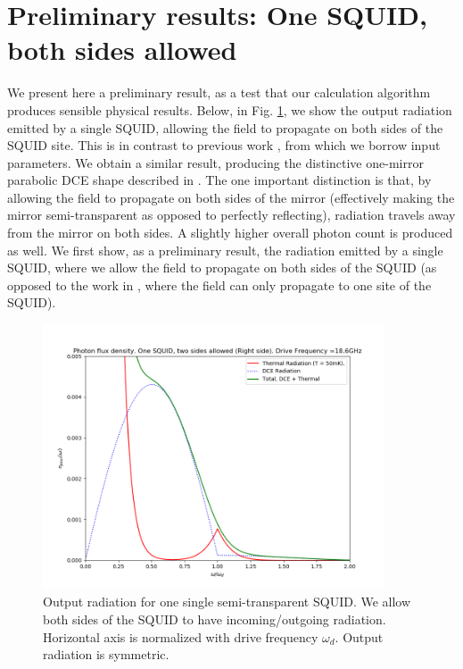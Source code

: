 \section{Preliminary results: One SQUID, both sides allowed}\label{sec:results_both_sides}
%
We present here a preliminary result, as a test that our calculation algorithm produces sensible physical results. Below, in Fig. \ref{fig:naked_SQUID}, we show the output radiation emitted by a single SQUID, allowing the field to propagate on both sides of the SQUID site. This is in contrast to previous work \cite{Johansson2009}, from which we borrow input parameters. We obtain a similar result, producing the distinctive one-mirror parabolic DCE shape described in \cite{Lambrecht1996}. The one important distinction is that, by allowing the field to propagate on both sides of the mirror (effectively making the mirror semi-transparent as opposed to perfectly reflecting), radiation travels away from the mirror on both sides. A slightly higher overall photon count is produced as well. 
%
We first show, as a preliminary result, the radiation emitted by a single SQUID, where we allow the field to propagate on both sides of the SQUID (as opposed to the work in \cite{Johansson2010}, where the field can only propagate to one site of the SQUID).  
%
\begin{figure}[h]
    \centering
    \includegraphics[width=0.9\textwidth, keepaspectratio]{figures/results/Naked_SQUID_right.png}
    \caption{Output radiation for one single semi-transparent SQUID. We allow both sides of the SQUID to have incoming/outgoing radiation. Horizontal axis is normalized with drive frequency $\omega_d$. Output radiation is symmetric.}
    \label{fig:naked_SQUID}
\end{figure}
%

